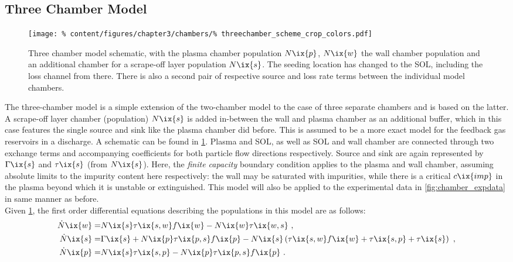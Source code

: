         \subsection{Three Chamber Model}\label{subsec:threechamb}%
%
            \begin{figure}[t]%
                \centering%
                \texttt{[image: \%
                    content/figures/chapter3/chambers/\%
                    threechamber\_scheme\_crop\_colors.pdf]}%
                \caption{Three chamber model schematic, with the plasma chamber population $N\ix{p}$, $N\ix{w}$ the wall chamber population and an additional chamber for a scrape-off layer population $N\ix{s}$. The seeding location has changed to the SOL, including the loss channel from there. There is also a second pair of respective source and loss rate terms between the individual model chambers.}\label{fig:threechamber_schematic}%
            \end{figure}%
%
            The three-chamber model is a simple extension of the two-chamber model to the case of three separate chambers and is based on the latter. A scrape-off layer chamber (population) $N\ix{s}$ is added in-between the wall and plasma chamber as an additional buffer, which in this case features the single source and sink like the plasma chamber did before. This is assumed to be a more exact model for the feedback gas reservoirs in a discharge. A schematic can be found in \cref{fig:threechamber_schematic}. Plasma and SOL, as well as SOL and wall chamber are connected through two exchange terms and accompanying coefficients for both particle flow directions respectively. Source and sink are again represented by $\Gamma\ix{s}$ and $\tau\ix{s}$ (from $N\ix{s}$). Here, the \textit{finite capacity} boundary condition applies to the plasma and wall chamber, assuming absolute limits to the impurity content here respectively: the wall may be saturated with impurities, while there is a critical $c\ix{imp}$ in the plasma beyond which it is unstable or extinguished. This model will also be applied to the experimental data in \cref{fig:chamber_expdata} in same manner as before.\\%
            Given \cref{fig:threechamber_schematic}, the first order differential equations describing the populations in this model are as follows:%
%
            \begin{align}%
                \begin{split}\label{eq:threechamber_base}%
                    \dot{N}\ix{w}=&N\ix{s}\tau\ix{s,w}f\ix{w}-N\ix{w}\tau\ix{w,s}\,\,,\\%
                    \dot{N}\ix{s}=&\Gamma\ix{s}+N\ix{p}\tau\ix{p,s}f\ix{p}-N\ix{s}\left(\tau\ix{s,w}f\ix{w}+\tau\ix{s,p}+\tau\ix{s}\right)\,\,,\\%
                    \dot{N}\ix{p}=&N\ix{s}\tau\ix{s,p}-N\ix{p}\tau\ix{p,s}f\ix{p}\,\,.%
                \end{split}%
            \end{align}%

